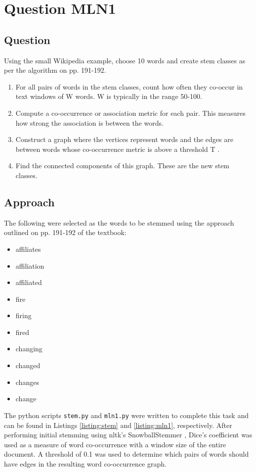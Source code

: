 \section{Question MLN1}


\subsection{Question}
Using the small Wikipedia example, choose 10 words and create stem classes as per the algorithm on pp. 191-192.

\begin{enumerate}
    \item For all pairs of words in the stem classes, count how often they co-occur in text windows of W words. W is typically in the range 50-100.
    \item Compute a co-occurrence or association metric for each pair. This measures how strong the association is between the words.
    \item Construct a graph where the vertices represent words and the edges are between words whose co-occurrence metric is above a threshold T .
    \item Find the connected components of this graph. These are the new stem classes.
\end{enumerate}


\subsection{Approach}
The following were selected as the words to be stemmed using the approach outlined on pp. 191-192 of the textbook:

\begin{itemize}
    \item affiliates
    \item affiliation
    \item affiliated
    \item fire
    \item firing
    \item fired
    \item changing
    \item changed
    \item changes
    \item change
\end{itemize}

The python scripts \texttt{stem.py} and \texttt{mln1.py} were written to complete this task and can be found in Listings \ref{listing:stem} and \ref{listing:mln1}, respectively.  After performing initial stemming using nltk's SnowballStemmer \cite{py:nltk}, Dice's coefficient was used as a measure of word co-occurrence with a window size of the entire document.  A threshold of 0.1 was used to determine which pairs of words should have edges in the resulting word co-occurrence graph.  


